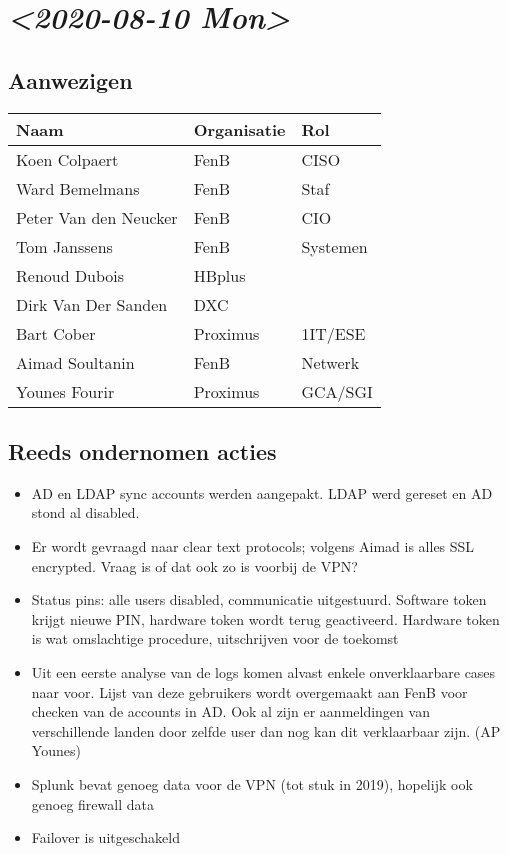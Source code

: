 \documentclass[11pt]{article}
\begin{document}
\section{\textit{<2020-08-10 Mon>}}
\label{sec:orgec5010f}

\subsection{Aanwezigen}
\label{sec:org4c4641a}

\begin{center}
\begin{tabular}{lll}
Naam & Organisatie & Rol\\
\hline
Koen Colpaert & FenB & CISO\\
Ward Bemelmans & FenB & Staf\\
Peter Van den Neucker & FenB & CIO\\
Tom Janssens & FenB & Systemen\\
Renoud Dubois & HBplus & \\
Dirk Van Der Sanden & DXC & \\
Bart Cober & Proximus & 1IT/ESE\\
Aimad Soultanin & FenB & Netwerk\\
Younes Fourir & Proximus & GCA/SGI\\
\end{tabular}
\end{center}

\subsection{Reeds ondernomen acties}
\label{sec:orgde58e83}
\begin{itemize}
\item AD en LDAP sync accounts werden aangepakt. LDAP werd gereset en AD stond al disabled.
\item Er wordt gevraagd naar clear text protocols; volgens Aimad is alles SSL encrypted. Vraag is of dat ook zo is voorbij de VPN?
\item Status pins: alle users disabled, communicatie uitgestuurd. Software token krijgt nieuwe PIN, hardware token wordt terug geactiveerd. Hardware token is wat omslachtige procedure, uitschrijven voor de toekomst
\item Uit een eerste analyse van de logs komen alvast enkele onverklaarbare cases naar voor. Lijst van deze gebruikers wordt overgemaakt aan FenB voor checken van de accounts in AD. Ook al zijn er aanmeldingen van verschillende landen door zelfde user dan nog kan dit verklaarbaar zijn. (AP Younes)
\item Splunk bevat genoeg data voor de VPN (tot stuk in 2019), hopelijk ook genoeg firewall data
\item Failover is uitgeschakeld
\end{itemize}
\end{document}
